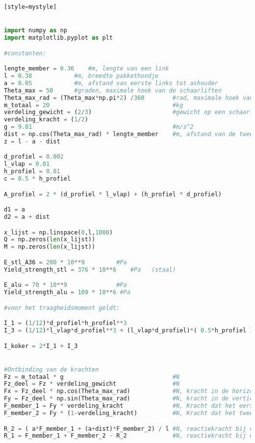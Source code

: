\begin{lstlisting}[language=Python][style=mystyle]


import numpy as np
import matplotlib.pyplot as plt

#constanten:

lengte_member = 0.36    #m, lengte van een link
l = 0.38            #m, breedte pakkethondje
a = 0.05            #m, afstand van eerste links tot ashouder
Theta_max = 50      #graden, maximale hoek van de schaarliften
Theta_max_rad = (Theta_max*np.pi*2) /360        #rad, maximale hoek van de schaarliften
m_totaal = 20                                   #kg
verdeling_gewicht = (2/3)                       #gewicht op een schaarlift (maximaal)
verdeling_kracht = (1/2)
g = 9.81                                        #m/s^2
dist = np.cos(Theta_max_rad) * lengte_member    #m, afstand van de twee links op het u-profiel
z = l - a - dist

d_profiel = 0.002
l_vlap = 0.01
h_profiel = 0.01
c = 0.5 * h_profiel

A_profiel = 2 * (d_profiel * l_vlap) + (h_profiel * d_profiel)

d1 = a                                  
d2 = a + dist

x_lijst = np.linspace(0,l,1000)
Q = np.zeros(len(x_lijst))
M = np.zeros(len(x_lijst))

E_stl_A36 = 200 * 10**9         #Pa
Yield_strength_stl = 376 * 10**6    #Pa   (staal)

E_alu = 70 * 10**9              #Pa
Yield_strength_alu = 109 * 10**6 #Pa

#voor het traagheidsmoment geldt:

I_1 = (1/12)*d_profiel*h_profiel**3
I_3 = (1/12)*l_vlap*d_profiel**3 + (l_vlap*d_profiel)*( 0.5*h_profiel )**2

I_koker = 2*I_1 + I_3


#Ontbinding van de krachten
Fz = m_totaal * g                               #N
Fz_deel = Fz * verdeling_gewicht                #N
Fx = Fz_deel * np.cos(Theta_max_rad)            #N, kracht in de horizontale richting uitgeoefend op het profiel 
Fy = Fz_deel * np.sin(Theta_max_rad)            #N, kracht in de verticale richting uitgeoefend op het profiel
F_member_1 = Fy * verdeling_kracht              #N, Kracht dat het eerste member uitoefent op het profiel
F_member_2 = Fy * (1-verdeling_kracht)          #N, Kracht dat het tweede member uitoefent op het profiel

R_2 = ( a*F_member_1 + (a+dist)*F_member_2) / l #N, reactiekracht bij de eerste ashouder
R_1 = F_member_1 + F_member_2 - R_2             #N, reactiekracht bij de tweede ashouder


\end{lstlisting}
